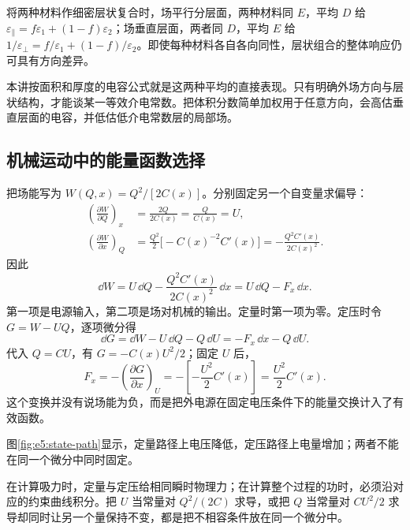 将两种材料作细密层状复合时，场平行分层面，两种材料同 $E$，平均 $D$ 给 $\varepsilon_\parallel=f\varepsilon_1+(1-f)\varepsilon_2$；场垂直层面，两者同 $D$，平均 $E$ 给 $1/\varepsilon_\perp=f/\varepsilon_1+(1-f)/\varepsilon_2$。即使每种材料各自各向同性，层状组合的整体响应仍可具有方向差异。

本讲按面积和厚度的电容公式就是这两种平均的直接表现。只有明确外场方向与层状结构，才能谈某一等效介电常数。把体积分数简单加权用于任意方向，会高估垂直层面的电容，并低估低介电常数层的局部场。

\subsection{机械运动中的能量函数选择}

把场能写为 $W(Q,x)=Q^2/[2C(x)]$。分别固定另一个自变量求偏导：
\begin{align*}
\left(\frac{\partial W}{\partial Q}\right)_x
&=\frac{2Q}{2C(x)}=\frac Q{C(x)}=U,\\
\left(\frac{\partial W}{\partial x}\right)_Q
&=\frac{Q^2}{2}\bigl[-C(x)^{-2}C'(x)\bigr]
=-\frac{Q^2C'(x)}{2C(x)^2}.
\end{align*}
因此
\[
\dd W=U\,\dd Q-\frac{Q^2C'(x)}{2C(x)^2}\,\dd x
=U\,\dd Q-F_x\,\dd x.
\]
第一项是电源输入，第二项是场对机械的输出。定量时第一项为零。定压时令 $G=W-UQ$，逐项微分得
\[
\dd G=\dd W-U\,\dd Q-Q\,\dd U=-F_x\,\dd x-Q\,\dd U.
\]
代入 $Q=CU$，有 $G=-C(x)U^2/2$；固定 $U$ 后，
\[
F_x=-\left(\frac{\partial G}{\partial x}\right)_U
=-\left[-\frac{U^2}{2}C'(x)\right]=\frac{U^2}{2}C'(x).
\]这个变换并没有说场能为负，而是把外电源在固定电压条件下的能量交换计入了有效函数。

\par 图\ref{fig:e5:state-path}显示，定量路径上电压降低，定压路径上电量增加；两者不能在同一个微分中同时固定。

在计算吸力时，定量与定压给相同瞬时物理力；在计算整个过程的功时，必须沿对应的约束曲线积分。把 $U$ 当常量对 $Q^2/(2C)$ 求导，或把 $Q$ 当常量对 $CU^2/2$ 求导却同时让另一个量保持不变，都是把不相容条件放在同一个微分中。


